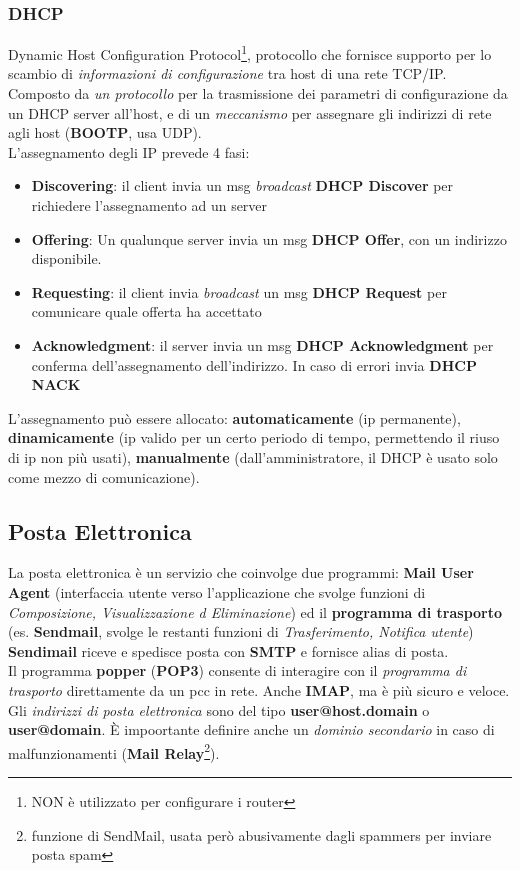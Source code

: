 \documentclass[a4paper,11pt]{article}
\begin{document}
\subsubsection{DHCP}
Dynamic Host Configuration Protocol\footnote{NON è utilizzato per configurare i router}, protocollo che fornisce supporto per lo scambio di \textit{informazioni di configurazione} tra host di una rete TCP/IP.\\
Composto da \textit{un protocollo} per la trasmissione dei parametri di configurazione da un DHCP server all'host, e di un \textit{meccanismo} per assegnare gli indirizzi di rete agli host (\textbf{BOOTP}, usa UDP).\\ 
L'assegnamento degli IP prevede 4 fasi:
\begin{itemize}
\item[1]\textbf{Discovering}: il client invia un msg \textit{broadcast} \textbf{DHCP Discover} per richiedere l'assegnamento ad un server
\item[2]\textbf{Offering}: Un qualunque server invia un msg \textbf{DHCP Offer}, con un indirizzo disponibile.
\item[3]\textbf{Requesting}: il client invia \textit{broadcast} un msg \textbf{DHCP Request} per comunicare quale offerta ha accettato
\item[4]\textbf{Acknowledgment}: il server invia un msg \textbf{DHCP Acknowledgment} per conferma dell'assegnamento dell'indirizzo. In caso di errori invia \textbf{DHCP NACK}
\end{itemize}
L'assegnamento può essere allocato: \textbf{automaticamente} (ip permanente), \textbf{dinamicamente} (ip valido per un certo periodo di tempo, permettendo il riuso di ip non più usati), \textbf{manualmente} (dall'amministratore, il DHCP è usato solo come mezzo di comunicazione).\newpage

\subsection{Posta Elettronica}
La posta elettronica è un servizio che coinvolge due programmi: \textbf{Mail User Agent} (interfaccia utente verso l'applicazione che svolge funzioni di \textit{Composizione, Visualizzazione d Eliminazione}) ed il \textbf{programma di trasporto} (es. \textbf{Sendmail}, svolge le restanti funzioni di \textit{Trasferimento, Notifica utente})\\
\textbf{Sendimail} riceve e spedisce posta con \textbf{SMTP} e fornisce alias di posta.\\
Il programma \textbf{popper} (\textbf{POP3}) consente di interagire con il \textit{programma di trasporto} direttamente da un pcc in rete. Anche \textbf{IMAP}, ma è più sicuro e veloce.\\
Gli \textit{indirizzi di posta elettronica} sono del tipo \textbf{user@host.domain} o \textbf{user@domain}. È impoortante definire anche un \textit{dominio secondario} in caso di malfunzionamenti (\textbf{Mail Relay}\footnote{funzione di SendMail, usata però abusivamente dagli spammers per inviare posta spam}).
\end{document}
